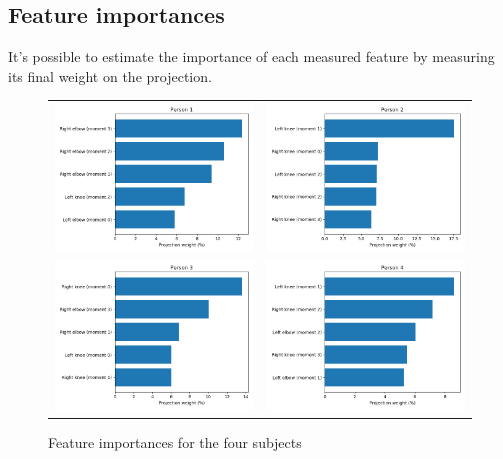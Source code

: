 \documentclass{bmvc2k}
\begin{document}
\subsection{Feature importances}

It's possible to estimate the importance of each measured feature by measuring its final weight on the projection\cite{statanalysis}.

\begin{figure}[H]
   \begin{center}
      \begin{tabular}{c c}
         \includegraphics[width=6cm]{figures/person1Imp.png}&\includegraphics[width=6cm]{figures/person2Imp.png}\\
         \includegraphics[width=6cm]{figures/person3Imp.png}&\includegraphics[width=6cm]{figures/person4Imp.png}
      \end{tabular}
   \end{center}
   \caption{Feature importances for the four subjects}
\end{figure}
\end{document}
